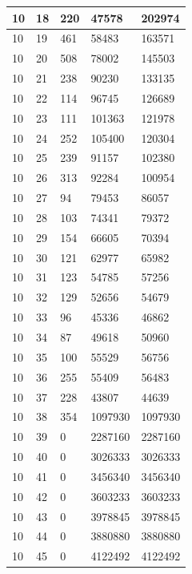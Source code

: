 \documentclass[12pt]{article}
\begin{document}
	\begin{tabular}{|m{3cm}|m{3cm}|m{2.5cm}|m{3.5cm}|m{2cm}|}
	\hline
		10 & 18 & 220 & 47578 & 202974 \\
		\hline
		10 & 19 & 461 & 58483 & 163571 \\
		\hline
		
		10 & 20 & 508 & 78002 & 145503 \\
		\hline
		10 & 21 & 238 & 90230 & 133135 \\
		\hline
		10 & 22 & 114 & 96745 & 126689 \\
		\hline
		10 & 23 & 111 & 101363 & 121978 \\
		\hline
		10 & 24 & 252 & 105400 & 120304 \\
		\hline
		10 & 25 & 239 & 91157 & 102380 \\
		\hline
		10 & 26 & 313 & 92284 & 100954 \\
		\hline
		10 & 27 & 94 & 79453 & 86057 \\
		\hline
		10 & 28 & 103 & 74341 & 79372 \\
		\hline
		10 & 29 & 154 & 66605 & 70394 \\
		\hline
		10 & 30 & 121 & 62977 & 65982 \\
		\hline
		10 & 31 & 123 & 54785 & 57256 \\
		\hline
		10 & 32 & 129 & 52656 & 54679 \\
		\hline
		10 & 33 & 96 & 45336 & 46862 \\
		\hline
		10 & 34 & 87 & 49618 & 50960 \\
		\hline
		10 & 35 & 100 & 55529 & 56756 \\
		\hline
		10 & 36 & 255 & 55409 & 56483 \\
		\hline
		10 & 37 & 228 & 43807 & 44639 \\
		\hline
		10 & 38 & 354 & 1097930 & 1097930 \\
		\hline
		10 & 39 & 0 & 2287160 & 2287160 \\
		\hline
		10 & 40 & 0 & 3026333 & 3026333 \\
		\hline
		10 & 41 & 0 & 3456340 & 3456340 \\
		\hline
		10 & 42 & 0 & 3603233 & 3603233 \\
		\hline
		10 & 43 & 0 & 3978845 & 3978845 \\
		\hline
		10 & 44 & 0 & 3880880 & 3880880 \\
		\hline
		10 & 45 & 0 & 4122492 & 4122492 \\
		\hline
	\end{tabular}
	
\end{document}
